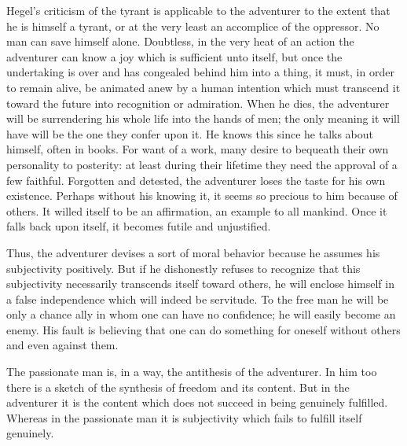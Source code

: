 \documentclass[11pt]{article}
\begin{document}
Hegel’s criticism of the tyrant is applicable to the adventurer to the extent that he is himself a tyrant, or at the very least an accomplice of the oppressor. No man can save himself alone. Doubtless, in the very heat of an action the adventurer can know a joy which is sufficient unto itself, but once the undertaking is over and has congealed behind him into a thing, it must, in order to remain alive, be animated anew by a human intention which must transcend it toward the future into recognition or admiration. When he dies, the adventurer will be surrendering his whole life into the hands of men; the only meaning it will have will be the one they confer upon it. He knows this since he talks about himself, often in books. For want of a work, many desire to bequeath their own personality to posterity: at least during their lifetime they need the approval of a few faithful. Forgotten and detested, the adventurer loses the taste for his own existence. Perhaps without his knowing it, it seems so precious to him because of others. It willed itself to be an affirmation, an example to all mankind. Once it falls back upon itself, it becomes futile and unjustified.

Thus, the adventurer devises a sort of moral behavior because he assumes his subjectivity positively. But if he dishonestly refuses to recognize that this subjectivity necessarily transcends itself toward others, he will enclose himself in a false independence which will indeed be servitude. To the free man he will be only a chance ally in whom one can have no confidence; he will easily become an enemy. His fault is believing that one can do something for oneself without others and even against them.

The passionate man is, in a way, the antithesis of the adventurer. In him too there is a sketch of the synthesis of freedom and its content. But in the adventurer it is the content which does not succeed in being genuinely fulfilled. Whereas in the passionate man it is subjectivity which fails to fulfill itself genuinely.
\end{document}
